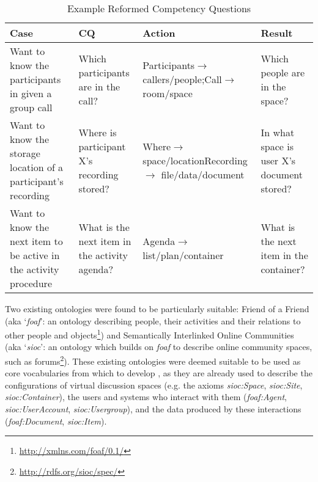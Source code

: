 \begin{table}
  \caption{Example Reformed Competency Questions}
  \label{tab:CQ_reformed}
  \begin{tabular}{p{3.2cm} p{3cm} p{2.8cm} p{3cm} }
    \toprule
    Case&CQ&Action&Result\\
    \midrule
    Want to know the participants in given a group call&Which participants are in the call?&Participants$\rightarrow$ \newline callers/people;\newline Call$\rightarrow$ room/space&Which people are in the space?\\ 
    \midrule
    Want to know the storage location of a participant's recording&Where is participant X’s recording stored?&Where$\rightarrow$ space/location\newline Recording$\rightarrow$ file/data/document&In what space is user X’s document stored?\\ 
    \midrule
    Want to know the next item to be active in the activity procedure&What is the next item in the activity agenda?&Agenda$\rightarrow$\newline list/plan/container&What is the next item in the container?\\ 
  \bottomrule
\end{tabular}
\end{table}


Two existing ontologies were found to be particularly suitable: Friend of a Friend (aka `\textit{foaf}': an ontology describing people, their activities and their relations to other people and objects\footnote{\url{http://xmlns.com/foaf/0.1/}}) and Semantically Interlinked Online Communities (aka `\textit{sioc}': an ontology which builds on \textit{foaf} to describe online community spaces, such as forums\footnote{\url{http://rdfs.org/sioc/spec/}}). These existing ontologies were deemed suitable to be used as core vocabularies from which to develop \ONT{}, as they are already used to describe the configurations of virtual discussion spaces (e.g. the axioms \textit{sioc:Space}, \textit{sioc:Site}, \textit{sioc:Container}), the users and systems who interact with them (\textit{foaf:Agent}, \textit{sioc:UserAccount}, \textit{sioc:Usergroup}), and the data produced by these interactions (\textit{foaf:Document}, \textit{sioc:Item}).